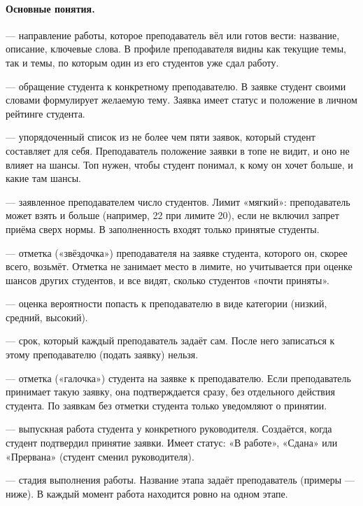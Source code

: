 \documentclass[a4paper,12pt]{article}
\begin{document}
\paragraph{Основные понятия.}
\begin{description}[leftmargin=2cm,style=nextline]
  \item[Тема] — направление работы, которое преподаватель вёл или готов вести: название, описание, ключевые слова. В профиле преподавателя видны как текущие темы, так и темы, по которым один из его студентов уже сдал работу.
  \item[Заявка] — обращение студента к конкретному преподавателю. В заявке студент своими словами формулирует желаемую тему. Заявка имеет статус и положение в личном рейтинге студента.
  \item[Топ студента] — упорядоченный список из не более чем пяти заявок, который студент составляет для себя. Преподаватель положение заявки в топе не видит, и оно не влияет на шансы. Топ нужен, чтобы студент понимал, к кому он хочет больше, и какие там шансы.
  \item[Лимит мест] — заявленное преподавателем число студентов. Лимит «мягкий»: преподаватель может взять и больше (например, 22 при лимите 20), если не включил запрет приёма сверх нормы. В заполненность входят только принятые студенты.
  \item[Избранное] — отметка («звёздочка») преподавателя на заявке студента, которого он, скорее всего, возьмёт. Отметка не занимает место в лимите, но учитывается при оценке шансов других студентов, и все видят, сколько студентов «почти приняты».
  \item[Шанс] — оценка вероятности попасть к преподавателю в виде категории (низкий, средний, высокий).
  \item[Дата окончания отбора] — срок, который каждый преподаватель задаёт сам. После него записаться к этому преподавателю (подать заявку) нельзя.
  \item[Автоподтверждение] — отметка («галочка») студента на заявке к преподавателю. Если преподаватель принимает такую заявку, она подтверждается сразу, без отдельного действия студента. По заявкам без отметки студента только уведомляют о принятии.
  \item[Работа] — выпускная работа студента у конкретного руководителя. Создаётся, когда студент подтвердил принятие заявки. Имеет статус: «В работе», «Сдана» или «Прервана» (студент сменил руководителя).
  \item[Этап] — стадия выполнения работы. Название этапа задаёт преподаватель (примеры — ниже). В каждый момент работа находится ровно на одном этапе.

\end{description}
\end{document}
